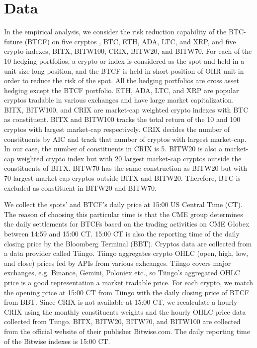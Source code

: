 \section{Data}\label{subsec:data}

\natp{\em [I suggest to merge this with the results part titled ``Empirical results'' with ``.1
  Data''}

In the empirical analysis, we consider the risk reduction capability of the BTC-future (BTCF) on five cryptos
, BTC, ETH, ADA, LTC, and XRP, and five crypto indexes, BITX, BITW100, CRIX, BITW20, and BITW70,
For each of the 10 hedging portfolios, a crypto or index is considered as the spot and held in a unit size long position,
and the BTCF is held in short position of OHR unit in order to reduce the risk of the spot.
All the hedging portfolios are cross asset hedging except the BTCF portfolio.
ETH, ADA, LTC, and XRP are popular cryptos tradable in various exchanges and have large market capitalization.
BITX, BITW100, and CRIX are market-cap weighted crypto indexes with BTC as constituent.
BITX and BITW100 tracks the total return of the 10 and 100 cryptos with largest market-cap respectively.
CRIX decides the number of constituents by AIC and track that number of cryptos with largest market-cap.
In our case, the number of constituents in CRIX is 5.
BITW20 is also a market-cap weighted crypto index but with 20 largest market-cap cryptos outside the constituents of
BITX.
BITW70 has the same construction as BITW20 but with 70 largest market-cap cryptos outside BITX and BITW20.
Therefore, BTC is excluded as constituent in BITW20 and BITW70. \medskip

We collect the spots' and BTCF's daily price at 15:00 US Central Time (CT).
The reason of choosing this particular time is that the CME group determines the daily settlements for BTCFs based on the trading activities on CME Globex between 14:59 and 15:00 CT.
15:00 CT is also the reporting time of the daily closing price by the Bloomberg Terminal (BBT).
Cryptos data are collected from a data provider called Tiingo.
Tiingo aggregates crypto OHLC (open, high, low, and close) prices fed by APIs from various exhcanges.
Tiingo covers major exchanges, e.g. Binance, Gemini, Poloniex etc., so Tiingo's aggregated OHLC price is a good representation a market tradable price.
For each crypto, we match the opening price at 15:00 CT from Tiingo with the daily closing price of BTCF from BBT.
Since CRIX is not available at 15:00 CT, we recalculate a hourly CRIX using the monthly constituents weights and the hourly OHLC price data collected from Tiingo.
BITX, BITW20, BITW70, and BITW100 are collected from the official website of their publisher Bitwise.com.
The daily reporting time of the Bitwise indexes is 15:00 CT. \medskip

